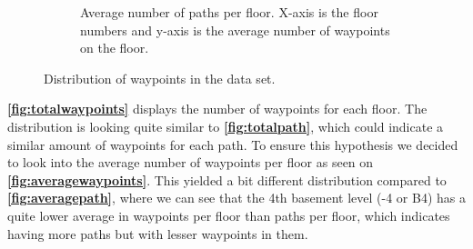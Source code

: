 \begin{figure}[H]
\begin{subfigure}[b]{0.49\textwidth}
         \caption{Average number of paths per floor. X-axis is the floor numbers and y-axis is the average number of waypoints on the floor.}
         \label{fig:averagewaypoints}
     \end{subfigure}
        \caption{Distribution of waypoints in the data set.}
        \label{fig:datadistribution2}
\end{figure}

\textbf{\autoref{fig:totalwaypoints}} displays the number of waypoints for each floor. The distribution is looking quite similar to \textbf{\autoref{fig:totalpath}}, which could indicate a similar amount of waypoints for each path. To ensure this hypothesis we decided to look into the average number of waypoints per floor as seen on \textbf{\autoref{fig:averagewaypoints}}. This yielded a bit different distribution compared to \textbf{\autoref{fig:averagepath}}, where we can see that the 4th basement level (-4 or B4) has a quite lower average in waypoints per floor than paths per floor, which indicates having more paths but with lesser waypoints in them.










